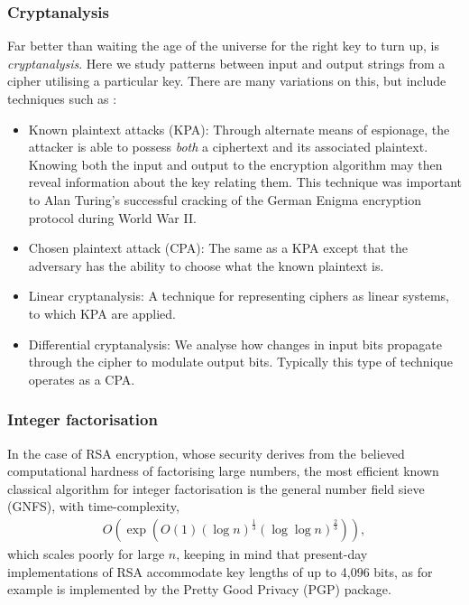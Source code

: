 %
%

\subsubsection{Cryptanalysis}

Far better than waiting the age of the universe for the right key to turn up, is \textit{cryptanalysis}. Here we study patterns between input and output strings from a cipher utilising a particular key. There are many variations on this, but include techniques such as \cite{bib:Schneier96}:

\begin{itemize}
	\item Known plaintext attacks (KPA): Through alternate means of espionage, the attacker is able to possess \textit{both} a ciphertext and its associated plaintext. Knowing both the input and output to the encryption algorithm may then reveal information about the key relating them. This technique was important to Alan Turing's successful cracking of the German Enigma encryption protocol during World War II.
	\item Chosen plaintext attack (CPA): The same as a KPA except that the adversary has the ability to choose what the known plaintext is.
	\item Linear cryptanalysis: A technique for representing ciphers as linear systems, to which KPA are applied.
	\item Differential cryptanalysis: We analyse how changes in input bits propagate through the cipher to modulate output bits. Typically this type of technique operates as a CPA.
\end{itemize}
 
%
%
 
\subsubsection{Integer factorisation}

In the case of RSA encryption, whose security derives from the believed computational hardness of factorising large numbers, the most efficient known classical algorithm for integer factorisation is the general number field sieve (GNFS), with time-complexity,
\begin{align} \label{eq:GNFS_scaling}
	O(\exp (O(1) (\log n)^{\frac{1}{3}} (\log\log n)^{\frac{2}{3}})),
\end{align}
which scales poorly for large $n$, keeping in mind that present-day implementations of RSA accommodate key lengths of up to 4,096 bits, as for example is implemented by the Pretty Good Privacy (PGP) package.

